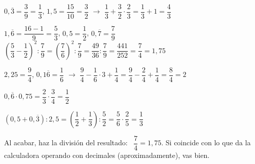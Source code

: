 \documentclass[11pt,a4paper]{article}
\begin{document}
\begin{exemple}
$0{,}\overline{3}=\dfrac39=\dfrac13$, \quad $1{,}5=\dfrac{15}{10}=\dfrac32$ \quad $\to$ \quad $\dfrac13+\dfrac32\cdot\dfrac23=\dfrac13+1=\boxed{\dfrac43}$
\end{exemple}

\begin{exemple}
$1{,}\overline{6}=\dfrac{16-1}{9}=\dfrac53$, \quad $0{,}5=\dfrac12$, \quad $0{,}\overline{7}=\dfrac79$\\[6pt]
$\left(\dfrac53-\dfrac12\right)^{2}:\dfrac79=\left(\dfrac76\right)^{2}:\dfrac79=\dfrac{49}{36}:\dfrac79=\dfrac{441}{252}=\boxed{\dfrac74}=1{,}75$
\end{exemple}

\begin{exemple}
$2{,}25=\dfrac94$, \quad $0{,}1\overline{6}=\dfrac16$ \quad $\to$ \quad $\dfrac94-\dfrac16\cdot3+\dfrac14=\dfrac94-\dfrac24+\dfrac14=\dfrac84=\boxed{2}$
\end{exemple}

\begin{exemple}
\begin{minipage}[t]{0.42\linewidth}
$0{,}\overline{6}\cdot0{,}75=\dfrac23\cdot\dfrac34=\boxed{\dfrac12}$
\end{minipage}\hfill
\begin{minipage}[t]{0.55\linewidth}
$\left(0{,}5+0{,}\overline{3}\right):2{,}5=\left(\dfrac12+\dfrac13\right):\dfrac52=\dfrac56\cdot\dfrac25=\boxed{\dfrac13}$
\end{minipage}
\end{exemple}

\begin{truc}
Al acabar, haz la división del resultado: \ $\dfrac74=1{,}75$. Si coincide con lo que da la calculadora operando con decimales (aproximadamente), vas bien.
\end{truc}
\end{document}
